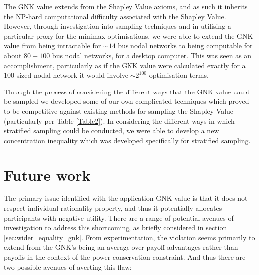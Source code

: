 The GNK value extends from the Shapley Value axioms, and as such it inherits the NP-hard computational difficulty associated with the Shapley Value.
However, through investigation into sampling techniques and in utilising a particular proxy for the minimax-optimisations, we were able to extend the GNK value from being intractable for $\sim 14$ bus nodal networks to being computable for about $80-100$ bus nodal networks, for a desktop computer.
This was seen as an accomplishment, particularly as if the GNK value were calculated exactly for a 100 sized nodal network it would involve $\sim 2^{100}$ optimisation terms.

Through the process of considering the different ways that the GNK value could be sampled we developed some of our own complicated techniques which proved to be competitive against existing methods for sampling the Shapley Value (particularly per Table \ref{Table2}).
In considering the different ways in which stratified sampling could be conducted, we were able to develop a new concentration inequality which was developed specifically for stratified sampling.




\section{Future work}
\label{sec:future}

The primary issue identified with the application GNK value is that it does not respect individual rationality property, and thus it potentially allocates participants with negative utility. There are a range of potential avenues of investigation to address this shortcoming, as briefly considered in section \ref{sec:wider_equality_gnk}.
From experimentation, the violation seems primarily to extend from the GNK's being an average over payoff advantages rather than payoffs in the context of the power conservation constraint.
And thus there are two possible avenues of averting this flaw:

